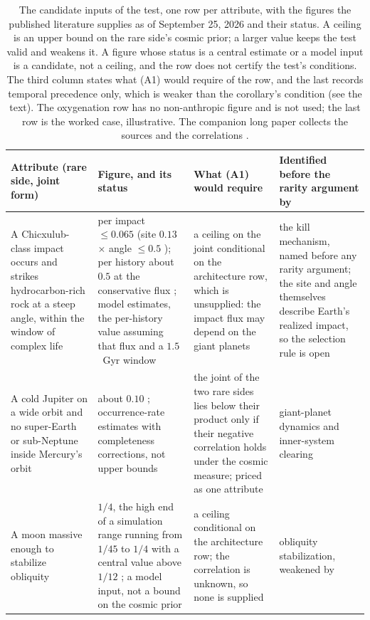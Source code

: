 \begin{table}[ht]
\centering
\small
\caption{The candidate inputs of the test, one row per attribute, with the figures the published literature supplies as of September 25, 2026 and their status. A ceiling is an upper bound on the rare side's cosmic prior; a larger value keeps the test valid and weakens it. A figure whose status is a central estimate or a model input is a candidate, not a ceiling, and the row does not certify the test's conditions. The third column states what {\rm (A1)} would require of the row, and the last records temporal precedence only, which is weaker than the corollary's condition (see the text). The oxygenation row has no non-anthropic figure and is not used; the last row is the worked case, illustrative. The companion long paper collects the sources and the correlations \cite{Nexus}.}
\label{tab:application}
\begin{tabular}{p{} p{} p{} p{}}
\hline
Attribute (rare side, joint form) & Figure, and its status & What {\rm (A1)} would require & Identified before the rarity argument by \\
\hline
A Chicxulub-class impact occurs and strikes hydrocarbon-rich rock at a steep angle, within the window of complex life & per impact $\le 0.065$ (site $0.13$ \cite{Kaiho2017} $\times$ angle $\le 0.5$ \cite{collins2020chicxulub}); per history about $0.5$ at the conservative flux \cite{nesvorny2021dark}; model estimates, the per-history value assuming that flux and a $1.5$~Gyr window & a ceiling on the joint conditional on the architecture row, which is unsupplied: the impact flux may depend on the giant planets & the kill mechanism, named before any rarity argument; the site and angle themselves describe Earth's realized impact, so the selection rule is open \\
A cold Jupiter on a wide orbit and no super-Earth or sub-Neptune inside Mercury's orbit & about $0.10$ \cite{mulders2018epos, zhu2018thirty, fulton2021cls, bryan2019excess, rosenthal2022cls3, bonomo2023cold}; occurrence-rate estimates with completeness corrections, not upper bounds & the joint of the two rare sides lies below their product only if their negative correlation holds under the cosmic measure; priced as one attribute & giant-planet dynamics and inner-system clearing \\
A moon massive enough to stabilize obliquity & $1/4$, the high end of a simulation range running from $1/45$ to $1/4$ with a central value above $1/12$ \cite{elser2011moon, laskar1993stabilization}; a model input, not a bound on the cosmic prior & a ceiling conditional on the architecture row; the correlation is unknown, so none is supplied & obliquity stabilization, weakened by \cite{lissauer2012obliquity} \\

\end{tabular}
\end{table}
